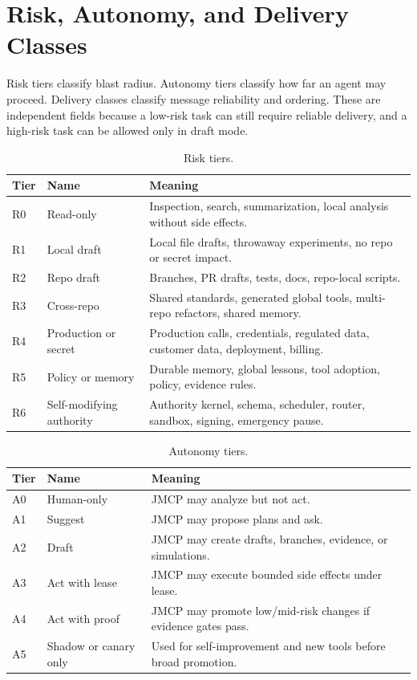 \documentclass[journal,onecolumn]{IEEEtran}
\begin{document}
\section{Risk, Autonomy, and Delivery Classes}
Risk tiers classify blast radius. Autonomy tiers classify how far an agent may proceed. Delivery classes classify message reliability and ordering. These are independent fields because a low-risk task can still require reliable delivery, and a high-risk task can be allowed only in draft mode.

\begin{longtable}{p{}p{}p{}}
\caption{Risk tiers.}\\
\toprule
Tier & Name & Meaning\\
\midrule
R0 & Read-only & Inspection, search, summarization, local analysis without side effects.\\
R1 & Local draft & Local file drafts, throwaway experiments, no repo or secret impact.\\
R2 & Repo draft & Branches, PR drafts, tests, docs, repo-local scripts.\\
R3 & Cross-repo & Shared standards, generated global tools, multi-repo refactors, shared memory.\\
R4 & Production or secret & Production calls, credentials, regulated data, customer data, deployment, billing.\\
R5 & Policy or memory & Durable memory, global lessons, tool adoption, policy, evidence rules.\\
R6 & Self-modifying authority & Authority kernel, schema, scheduler, router, sandbox, signing, emergency pause.\\
\bottomrule
\end{longtable}

\begin{longtable}{p{}p{}p{}}
\caption{Autonomy tiers.}\\
\toprule
Tier & Name & Meaning\\
\midrule
A0 & Human-only & JMCP may analyze but not act.\\
A1 & Suggest & JMCP may propose plans and ask.\\
A2 & Draft & JMCP may create drafts, branches, evidence, or simulations.\\
A3 & Act with lease & JMCP may execute bounded side effects under lease.\\
A4 & Act with proof & JMCP may promote low/mid-risk changes if evidence gates pass.\\
A5 & Shadow or canary only & Used for self-improvement and new tools before broad promotion.\\
\bottomrule
\end{longtable}
\end{document}
